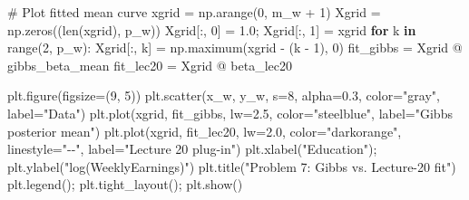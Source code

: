 \documentclass[
  letterpaper,
  DIV=11,
  numbers=noendperiod]{scrartcl}
\newenvironment{Shaded}{\begin{snugshade}}{\end{snugshade}}
\newcommand{\BuiltInTok}[1]{\textcolor[rgb]{0.00,0.23,0.31}{#1}}
\newcommand{\CommentTok}[1]{\textcolor[rgb]{0.37,0.37,0.37}{#1}}
\newcommand{\ControlFlowTok}[1]{\textcolor[rgb]{0.00,0.23,0.31}{\textbf{#1}}}
\newcommand{\DecValTok}[1]{\textcolor[rgb]{0.68,0.00,0.00}{#1}}
\newcommand{\FloatTok}[1]{\textcolor[rgb]{0.68,0.00,0.00}{#1}}
\newcommand{\KeywordTok}[1]{\textcolor[rgb]{0.00,0.23,0.31}{\textbf{#1}}}
\newcommand{\NormalTok}[1]{\textcolor[rgb]{0.00,0.23,0.31}{#1}}
\newcommand{\OperatorTok}[1]{\textcolor[rgb]{0.37,0.37,0.37}{#1}}
\newcommand{\StringTok}[1]{\textcolor[rgb]{0.13,0.47,0.30}{#1}}
\begin{document}
\begin{Shaded}
\begin{Highlighting}[]
\CommentTok{\# Plot fitted mean curve}
\NormalTok{xgrid }\OperatorTok{=}\NormalTok{ np.arange(}\DecValTok{0}\NormalTok{, m\_w }\OperatorTok{+} \DecValTok{1}\NormalTok{)}
\NormalTok{Xgrid }\OperatorTok{=}\NormalTok{ np.zeros((}\BuiltInTok{len}\NormalTok{(xgrid), p\_w))}
\NormalTok{Xgrid[:, }\DecValTok{0}\NormalTok{] }\OperatorTok{=} \FloatTok{1.0}\OperatorTok{;}\NormalTok{ Xgrid[:, }\DecValTok{1}\NormalTok{] }\OperatorTok{=}\NormalTok{ xgrid}
\ControlFlowTok{for}\NormalTok{ k }\KeywordTok{in} \BuiltInTok{range}\NormalTok{(}\DecValTok{2}\NormalTok{, p\_w):}
\NormalTok{    Xgrid[:, k] }\OperatorTok{=}\NormalTok{ np.maximum(xgrid }\OperatorTok{{-}}\NormalTok{ (k }\OperatorTok{{-}} \DecValTok{1}\NormalTok{), }\DecValTok{0}\NormalTok{)}
\NormalTok{fit\_gibbs }\OperatorTok{=}\NormalTok{ Xgrid }\OperatorTok{@}\NormalTok{ gibbs\_beta\_mean}
\NormalTok{fit\_lec20 }\OperatorTok{=}\NormalTok{ Xgrid }\OperatorTok{@}\NormalTok{ beta\_lec20}

\NormalTok{plt.figure(figsize}\OperatorTok{=}\NormalTok{(}\DecValTok{9}\NormalTok{, }\DecValTok{5}\NormalTok{))}
\NormalTok{plt.scatter(x\_w, y\_w, s}\OperatorTok{=}\DecValTok{8}\NormalTok{, alpha}\OperatorTok{=}\FloatTok{0.3}\NormalTok{, color}\OperatorTok{=}\StringTok{"gray"}\NormalTok{, label}\OperatorTok{=}\StringTok{"Data"}\NormalTok{)}
\NormalTok{plt.plot(xgrid, fit\_gibbs, lw}\OperatorTok{=}\FloatTok{2.5}\NormalTok{, color}\OperatorTok{=}\StringTok{"steelblue"}\NormalTok{, label}\OperatorTok{=}\StringTok{"Gibbs posterior mean"}\NormalTok{)}
\NormalTok{plt.plot(xgrid, fit\_lec20, lw}\OperatorTok{=}\FloatTok{2.0}\NormalTok{, color}\OperatorTok{=}\StringTok{"darkorange"}\NormalTok{, linestyle}\OperatorTok{=}\StringTok{"{-}{-}"}\NormalTok{,}
\NormalTok{         label}\OperatorTok{=}\StringTok{"Lecture 20 plug{-}in"}\NormalTok{)}
\NormalTok{plt.xlabel(}\StringTok{"Education"}\NormalTok{)}\OperatorTok{;}\NormalTok{ plt.ylabel(}\StringTok{"log(WeeklyEarnings)"}\NormalTok{)}
\NormalTok{plt.title(}\StringTok{"Problem 7: Gibbs vs. Lecture{-}20 fit"}\NormalTok{)}
\NormalTok{plt.legend()}\OperatorTok{;}\NormalTok{ plt.tight\_layout()}\OperatorTok{;}\NormalTok{ plt.show()}
\end{Highlighting}
\end{Shaded}
\end{document}

